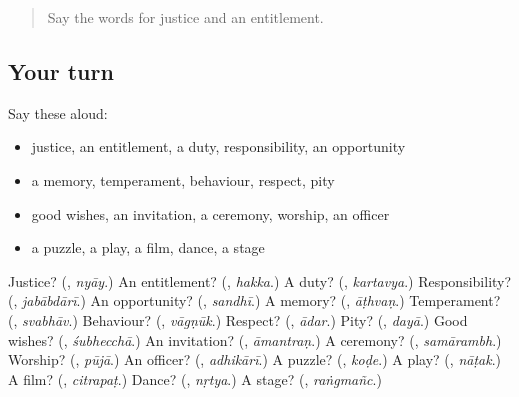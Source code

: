 \label{lesson:MR-R275-second-pass-words-from-chapters-272-275}



\begin{quote}
Say the words for justice and an entitlement.
\end{quote}

\subsection*{Your turn}
Say these aloud:

\begin{itemize}
\raggedright
  \item justice, an entitlement, a duty, responsibility, an opportunity
  \item a memory, temperament, behaviour, respect, pity
  \item good wishes, an invitation, a ceremony, worship, an officer
  \item a puzzle, a play, a film, dance, a stage
\end{itemize}

\begin{tcolorbox}[breakable,colback=teal!4,colframe=teal!35!black,title={Before you move on}]
Justice? (\textbf{}, \emph{nyāy}.) An entitlement? (\textbf{}, \emph{hakka}.) A duty? (\textbf{}, \emph{kartavya}.) Responsibility? (\textbf{}, \emph{jabābdārī}.) An opportunity? (\textbf{}, \emph{sandhī}.) A memory? (\textbf{}, \emph{āṭhvaṇ}.) Temperament? (\textbf{}, \emph{svabhāv}.) Behaviour? (\textbf{}, \emph{vāgṇūk}.) Respect? (\textbf{}, \emph{ādar}.) Pity? (\textbf{}, \emph{dayā}.) Good wishes? (\textbf{}, \emph{śubhecchā}.) An invitation? (\textbf{}, \emph{āmantraṇ}.) A ceremony? (\textbf{}, \emph{samārambh}.) Worship? (\textbf{}, \emph{pūjā}.) An officer? (\textbf{}, \emph{adhikārī}.) A puzzle? (\textbf{}, \emph{koḍe}.) A play? (\textbf{}, \emph{nāṭak}.) A film? (\textbf{}, \emph{citrapaṭ}.) Dance? (\textbf{}, \emph{nṛtya}.) A stage? (\textbf{}, \emph{raṅgmañc}.)
\end{tcolorbox}
